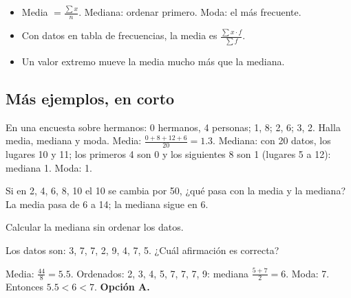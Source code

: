 
\begin{regla}
\begin{itemize}
  \item Media $= \tfrac{\sum x}{n}$. Mediana: ordenar primero. Moda: el más frecuente.
  \item Con datos en tabla de frecuencias, la media es $\tfrac{\sum x \cdot f}{\sum f}$.
  \item Un valor extremo mueve la media mucho más que la mediana.
\end{itemize}
\end{regla}

\subsection{Más ejemplos, en corto}
\begin{ejemplo}
En una encuesta sobre hermanos: 0 hermanos, 4 personas; 1, 8; 2, 6; 3, 2. Halla media, mediana y moda.
\solucion Media: $\tfrac{0 + 8 + 12 + 6}{20} = 1.3$. Mediana: con 20 datos, los lugares 10 y 11; los primeros 4 son 0 y
los siguientes 8 son 1 (lugares 5 a 12): mediana 1. Moda: 1.
\end{ejemplo}

\begin{ejemplo}
Si en 2, 4, 6, 8, 10 el 10 se cambia por 50, ¿qué pasa con la media y la mediana?
\solucion La media pasa de 6 a 14; la mediana sigue en 6.
\end{ejemplo}

\begin{trampa}
Calcular la mediana sin ordenar los datos.
\end{trampa}

\begin{reto}
Los datos son: 3, 7, 7, 2, 9, 4, 7, 5. ¿Cuál afirmación es correcta?
\end{reto}

\begin{retoresuelto}
Media: $\tfrac{44}{8} = 5.5$. Ordenados: 2, 3, 4, 5, 7, 7, 7, 9: mediana $\tfrac{5 + 7}{2} = 6$. Moda: 7. Entonces
$5.5 < 6 < 7$. \textbf{Opción A.}
\end{retoresuelto}

